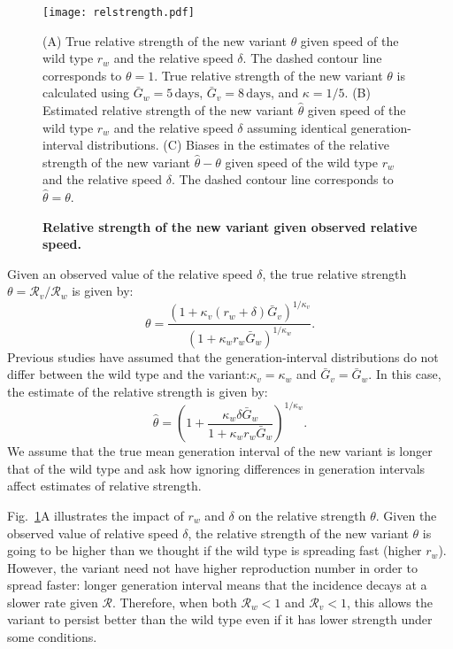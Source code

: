 \documentclass[12pt]{article}
\newcommand{\fref}[1]{Fig.~\ref{fig:#1}}
\newcommand{\RR}{\ensuremath{{\mathcal R}}\xspace}
\begin{document}
\begin{figure}[!th]
\texttt{[image: relstrength.pdf]}
\caption{
\textbf{Relative strength of the new variant given observed relative speed.}
}
(A) True relative strength of the new variant $\theta$ given speed of the wild type $r_w$ and the relative speed $\delta$.
The dashed contour line corresponds to $\theta = 1$.
True relative strength of the new variant $\theta$ is calculated using $\bar{G}_w = 5\,\textrm{days}$, $\bar{G}_v = 8\,\textrm{days}$, and $\kappa = 1/5$. 
(B) Estimated relative strength of the new variant $\hat{\theta}$ given speed of the wild type
$r_w$ and the relative speed $\delta$ assuming identical generation-interval distributions.
(C) Biases in the estimates of the relative strength of the new variant $\hat{\theta} - \theta$ given speed of the wild type $r_w$ and the relative speed $\delta$.
The dashed contour line corresponds to $\hat{\theta} = \theta$.
\label{fig:relstrength}
\end{figure}

Given an observed value of the relative speed $\delta$, the true relative strength $\theta = \RR_v/\RR_w$ is given by:
\begin{equation}
\theta = \frac{(1 + \kappa_v (r_w + \delta) \bar{G}_v)^{1/\kappa_v}}{(1 + \kappa_w r_w \bar{G}_w)^{1/\kappa_w}}.
\end{equation}
Previous studies have assumed that the generation-interval distributions do not differ between the wild type and the variant:$\kappa_v = \kappa_w$ and $\bar{G}_v = \bar{G}_w$.
In this case, the estimate of the relative strength is given by:
\begin{equation}
\hat{\theta} = \left(1 + \frac{\kappa_w \delta \bar{G}_w}{1 + \kappa_w r_w \bar{G}_w}\right)^{1/\kappa_w}.
\end{equation}
We assume that the true mean generation interval of the new variant is longer that of the wild type and ask how ignoring differences in generation intervals affect estimates of relative strength.

\fref{relstrength}A illustrates the impact of $r_w$ and $\delta$ on the relative strength $\theta$.
Given the observed value of relative speed $\delta$,
the relative strength of the new variant $\theta$ is going to be higher than we thought if the wild type is spreading fast (higher $r_w$).
However, the variant need not have higher reproduction number in order to spread faster: longer generation interval means that the incidence decays at a slower rate given $\RR$. 
Therefore, when both $\RR_w < 1$ and $\RR_v < 1$, this allows the variant to persist better than the wild type even if it has lower strength under some conditions.
\end{document}
